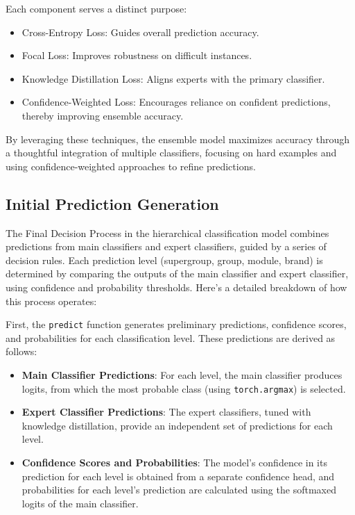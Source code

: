 \documentclass[9pt,a4paper,twoside]{rho-class/rho}
\begin{document}
Each component serves a distinct purpose:
\begin{itemize}
    \item Cross-Entropy Loss: Guides overall prediction accuracy.
    \item Focal Loss: Improves robustness on difficult instances.
    \item Knowledge Distillation Loss: Aligns experts with the primary classifier.
    \item Confidence-Weighted Loss: Encourages reliance on confident predictions, thereby improving ensemble accuracy.
\end{itemize}

By leveraging these techniques, the ensemble model maximizes accuracy through a thoughtful integration of multiple classifiers, focusing on hard examples and using confidence-weighted approaches to refine predictions.

 \subsection{Initial Prediction Generation}
    
      The Final Decision Process in the hierarchical classification model combines predictions from main classifiers and expert classifiers, guided by a series of decision rules. Each prediction level (supergroup, group, module, brand) is determined by comparing the outputs of the main classifier and expert classifier, using confidence and probability thresholds. Here’s a detailed breakdown of how this process operates:

First, the \verb|predict| function generates preliminary predictions, confidence scores, and probabilities for each classification level. These predictions are derived as follows:

\begin{itemize}
    \item \textbf{Main Classifier Predictions}: For each level, the main classifier produces logits, from which the most probable class (using \verb|torch.argmax|) is selected.
    \item \textbf{Expert Classifier Predictions}: The expert classifiers, tuned with knowledge distillation, provide an independent set of predictions for each level.
    \item \textbf{Confidence Scores and Probabilities}: The model’s confidence in its prediction for each level is obtained from a separate confidence head, and probabilities for each level’s prediction are calculated using the softmaxed logits of the main classifier.
\end{itemize}
\end{document}
